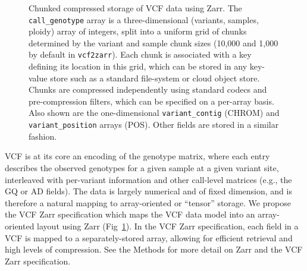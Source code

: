 \documentclass[a4paper,num-refs]{oup-contemporary}
\begin{document}
\begin{figure}
\resizebox{225pt}{!}{}
\caption{Chunked compressed storage of VCF data using Zarr. 
The \texttt{call\_genotype} array is a three-dimensional (variants, samples,
ploidy) array of integers, split into a uniform grid of 
chunks determined by the variant and sample chunk sizes (10,000
and 1,000 by default in \texttt{vcf2zarr}). Each chunk is associated 
with a key defining its location in this grid, which can be stored 
in any key-value store such as a standard file-system or cloud object
store. Chunks are compressed independently using standard 
codecs and pre-compression filters, which can be specified on a per-array
basis. Also shown are the one-dimensional \texttt{variant\_contig} (CHROM)
and \texttt{variant\_position} arrays (POS). Other fields are stored 
in a similar fashion. \label{fig-data-model}}
\end{figure}

VCF is at its core an encoding of the genotype matrix, where each entry
describes the observed genotypes for a given sample at a given variant site,
interleaved with per-variant information
and other call-level matrices (e.g., the GQ or AD fields).
The data is largely numerical and of fixed dimension, 
and is therefore a natural mapping to array-oriented 
or ``tensor'' storage.
We propose the VCF Zarr specification which maps the 
VCF data model into an array-oriented layout using Zarr 
(Fig~\ref{fig-data-model}). 
In the VCF Zarr specification, 
each field in a VCF is mapped to a separately-stored array, 
allowing for efficient retrieval and 
high levels of compression.
See the Methods for more detail on Zarr and the VCF Zarr
specification.
\end{document}
